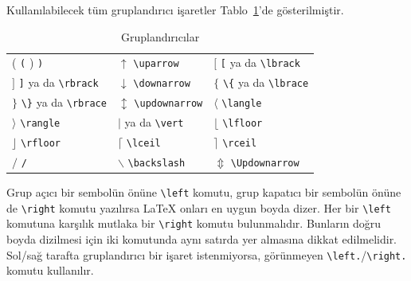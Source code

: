 \documentclass[
  letterpaper,
  DIV=11,
  numbers=noendperiod]{scrreprt}
\begin{document}
Kullanılabilecek tüm gruplandırıcı işaretler Tablo~\ref{tbl-grup}'de
gösterilmiştir.

\hypertarget{tbl-grup}{}
\begin{longtable}[]{@{}
  >{\raggedright\arraybackslash}p{}
  >{\raggedright\arraybackslash}p{}
  >{\raggedright\arraybackslash}p{}@{}}
\caption{\label{tbl-grup}Gruplandırıcılar}\tabularnewline
\toprule()
\endhead
( \texttt{(} ) \texttt{)} & \(\uparrow\)
\texttt{\textbackslash{}uparrow} & \([\) \texttt{{[}} ya da
\texttt{\textbackslash{}lbrack} \\
\(]\) \texttt{{]}} ya da \texttt{\textbackslash{}rbrack} &
\(\downarrow\) \texttt{\textbackslash{}downarrow} & \(\lbrace\)
\texttt{\textbackslash{}\{} ya da \texttt{\textbackslash{}lbrace} \\
\(\rbrace\) \texttt{\textbackslash{}\}} ya da
\texttt{\textbackslash{}rbrace} & \(\updownarrow\)
\texttt{\textbackslash{}updownarrow} & \(\langle\)
\texttt{\textbackslash{}langle} \\
\(\rangle\) \texttt{\textbackslash{}rangle} & \(\vert\)
\texttt{\textbar{}} ya da \texttt{\textbackslash{}vert} & \(\lfloor\)
\texttt{\textbackslash{}lfloor} \\
\(\rfloor\) \texttt{\textbackslash{}rfloor} & \(\lceil\)
\texttt{\textbackslash{}lceil} & \(\rceil\)
\texttt{\textbackslash{}rceil} \\
\(/\) \texttt{/} & \(\backslash\) \texttt{\textbackslash{}backslash} &
\(\Updownarrow\) \texttt{\textbackslash{}Updownarrow} \\
\bottomrule()
\end{longtable}

Grup açıcı bir sembolün önüne \texttt{\textbackslash{}left} komutu, grup
kapatıcı bir sembolün önüne de \texttt{\textbackslash{}right} komutu
yazılırsa {\LaTeX} onları en uygun boyda dizer. Her bir
\texttt{\textbackslash{}left} komutuna karşılık mutlaka bir
\texttt{\textbackslash{}right} komutu bulunmalıdır. Bunların doğru boyda
dizilmesi için iki komutunda aynı satırda yer almasına dikkat
edilmelidir. Sol/sağ tarafta gruplandırıcı bir işaret istenmiyorsa,
görünmeyen
\texttt{\textbackslash{}left.}/\texttt{\textbackslash{}right.} komutu
kullanılır.
\end{document}
